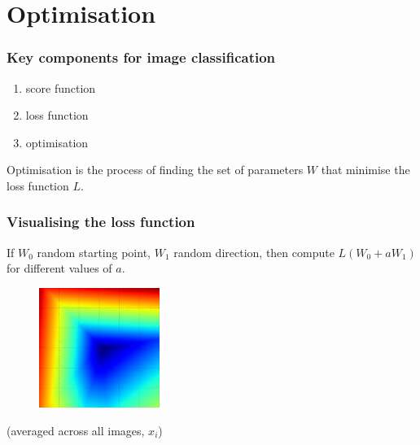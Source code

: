 
\section{Optimisation}

\begin{frame}
	\frametitle{Key components for image classification}

	\begin{enumerate}
		\item score function
		\item loss function
		\item optimisation
	\end{enumerate}

	Optimisation is the process of finding the set of parameters $W$ that 
	minimise the loss function $L$.

\end{frame}

\begin{frame}
	\frametitle{Visualising the loss function}

	\vskip 0.5cm
	If $W_0$ random starting point, $W_1$ random direction, then compute 
	$L(W_0 + a W_1)$ for different values of $a$.

	\centering
        \begin{figure}
                \includegraphics[width=0.35\textwidth]{Pics/svm_one.jpg}
        \end{figure}
	
	\small{(averaged across all images, $x_i$)}

\end{frame}

